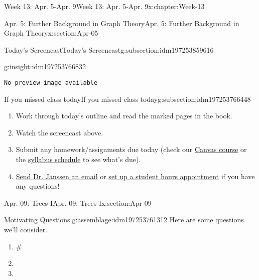 \documentclass[oneside,10pt,]{book}
\newcommand{\mono}[1]{\texttt{#1}}
\numberwithin{equation}{section}
\newlength{\previewwidth}
\begin{document}
\begin{chapterptx}{Week 13: Apr. 5-Apr. 9}{}{Week 13: Apr. 5-Apr. 9}{}{}{x:chapter:Week-13}
\begin{sectionptx}{Apr. 5: Further Background in Graph Theory}{}{Apr. 5: Further Background in Graph Theory}{}{}{x:section:Apr-05}
\begin{subsectionptx}{Today's Screencast}{}{Today's Screencast}{}{}{g:subsection:idm197253859616}
\begin{insight}{}{g:insight:idm197253766832}
\begin{tcbraster}[raster columns=2, raster column skip=1pt, raster halign=center, raster force size=false, raster left skip=0pt, raster right skip=0pt]
\begin{tcolorbox}[previewstyle, width=\previewwidth]%
\mono{No preview image available}%
\end{tcolorbox}%
\begin{tcolorbox}[qrstyle]%
[QR LINK]\end{tcolorbox}%
\end{tcbraster}%
\end{insight}
\end{subsectionptx}
%
%
\typeout{************************************************}
\typeout{************************************************}
%
\begin{subsectionptx}{If you missed class today}{}{If you missed class today}{}{}{g:subsection:idm197253766448}
%
\begin{enumerate}
\item{}Work through today's outline and read the marked pages in the book.%
\item{}Watch the screencast above.%
\item{}Submit any homework\slash{}assignments due today (check our \href{https://dordt.instructure.com/courses/3110050}{Canvas course} or the \href{https://prof.mkjanssen.org/ds/index.html\#schedule}{syllabus schedule} to see what's due).%
\item{}\href{mailto:mike.janssen@dordt.edu}{Send Dr. Janssen an email} or \href{https://calendly.com/mkjanssen/student-hours}{set up a student hours appointment} if you have any questions!%
\end{enumerate}
\end{subsectionptx}
\end{sectionptx}
%
%
\typeout{************************************************}
\typeout{************************************************}
%
\begin{sectionptx}{Apr. 09: Trees I}{}{Apr. 09: Trees I}{}{}{x:section:Apr-09}
\begin{introduction}{}%
\begin{assemblage}{Motivating Questions.}{g:assemblage:idm197253761312}%
Here are some questions we'll consider. %
\begin{enumerate}
\item{}\#%
\item{}%
\item{}%
\end{enumerate}
%
\end{assemblage}
\end{introduction}%

\end{sectionptx}
\end{chapterptx}
\end{document}
